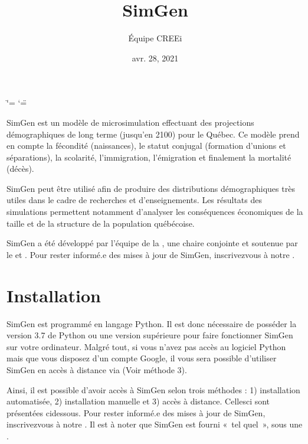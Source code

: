 \documentclass[letterpaper,10pt,french]{sphinxmanual}
\title{SimGen}
\date{avr. 28, 2021}
\author{Équipe CREEi}
\begin{document}
\ifdefined\shorthandoff
  \ifnum\catcode`\=\string=\active\shorthandoff{=}\fi
  \ifnum\catcode`\"=\active{}\fi
\fi

\pagestyle{empty}
\sphinxmaketitle
\pagestyle{plain}
\sphinxtableofcontents
\pagestyle{normal}
\label{\detokenize{index::doc}}


SimGen est un modèle de microsimulation effectuant des projections démographiques de long terme (jusqu’en 2100) pour le Québec.
Ce modèle prend en compte la fécondité (naissances), le statut conjugal (formation d’unions et séparations), la scolarité, l’immigration, l’émigration
et finalement la mortalité (décès).

SimGen peut être utilisé afin de produire des distributions démographiques très utiles dans le cadre de recherches et d’enseignements.
Les résultats des simulations permettent notamment d’analyser les conséquences économiques de la taille et de la structure de la population québécoise.

SimGen a été développé par l’équipe
de la ,
une chaire conjointe  et 
soutenue par le  et
.
Pour rester informé.e des mises à jour de SimGen, inscrivez\sphinxhyphen{}vous à notre .


\chapter{Installation}
\label{\detokenize{installation:installation}}\label{\detokenize{installation:premierpas}}\label{\detokenize{installation::doc}}\label{\detokenize{installation:installing-docdir}}
SimGen est programmé en langage Python. Il est donc nécessaire de posséder la version 3.7 de Python ou une version supérieure
pour faire fonctionner SimGen sur votre ordinateur.
Malgré tout, si vous n’avez pas accès au logiciel Python mais que vous disposez d’un compte Google, il vous
sera possible d’utiliser SimGen en accès à distance via  (Voir méthode 3).

Ainsi, il est possible d’avoir accès à SimGen selon trois méthodes : 1) installation automatisée, 2) installation manuelle et 3) accès à distance.
Celles\sphinxhyphen{}ci sont présentées ci\sphinxhyphen{}dessous.
Pour rester informé.e des mises à jour de SimGen, inscrivez\sphinxhyphen{}vous à notre .
Il est à noter que SimGen est fourni « tel quel », sous une .
\end{document}
